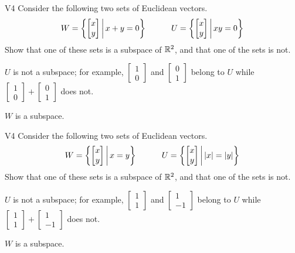 \begin{problem}{V4}
Consider the following two sets of Euclidean vectors.
\[
  W = \left\{\begin{bmatrix} x \\ y \end{bmatrix}\,\middle|\,x+y=0\right\}
\hspace{3em}
  U = \left\{\begin{bmatrix} x \\ y \end{bmatrix}\,\middle|\,xy=0\right\}
\]
Show that one of these sets is a subspace of \(\mathbb{R}^2\), and
that one of the sets is not.
\end{problem}
\begin{solution}
\(U\) is not a subspace; for example, \(\begin{bmatrix} 1 \\ 0 \end{bmatrix}\)
and \(\begin{bmatrix} 0 \\ 1 \end{bmatrix}\) belong to \(U\) while
\(\begin{bmatrix} 1 \\ 0 \end{bmatrix}+\begin{bmatrix} 0 \\ 1 \end{bmatrix}\)
does not.

\(W\) is a subspace.
\end{solution}

\begin{problem}{V4}
Consider the following two sets of Euclidean vectors.
\[
  W = \left\{\begin{bmatrix} x \\ y \end{bmatrix}\,\middle|\,x=y\right\}
\hspace{3em}
  U = \left\{\begin{bmatrix} x \\ y \end{bmatrix}\,\middle|\,|x|=|y|\right\}
\]
Show that one of these sets is a subspace of \(\mathbb{R}^2\), and
that one of the sets is not.
\end{problem}
\begin{solution}
\(U\) is not a subspace; for example, \(\begin{bmatrix} 1 \\ 1 \end{bmatrix}\)
and \(\begin{bmatrix} 1 \\ -1 \end{bmatrix}\) belong to \(U\) while
\(\begin{bmatrix} 1 \\ 1 \end{bmatrix}+\begin{bmatrix} 1 \\ -1 \end{bmatrix}\)
does not.

\(W\) is a subspace.
\end{solution}

